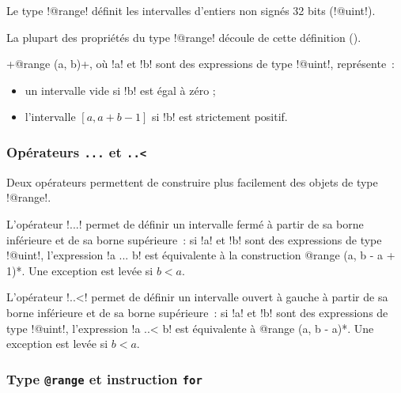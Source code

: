




Le type \ggsq!@range! définit les intervalles d'entiers non signés 32 bits (\ggsq!@uint!).


La plupart des propriétés du type \ggsq!@range! découle de cette définition ().

\ggsq+@range (a, b)+, où \ggsq!a! et \ggsq!b! sont des expressions de type \ggsq!@uint!, représente~:
\begin{itemize}
  \item un intervalle vide si \ggsq!b! est égal à zéro ;
  \item l'intervalle $[a, a+b-1]$ si \ggsq!b! est strictement positif.
\end{itemize}



\subsubsection{Opérateurs \texttt{.{}.{}.} et \texttt{.{}.{}<}}

Deux opérateurs permettent de construire plus facilement des objets de type \ggsq!@range!.

L'opérateur \ggsq!...! permet de définir un intervalle fermé à partir de sa borne inférieure et de sa borne supérieure~: si \ggsq!a! et \ggsq!b! sont des expressions de type \ggsq!@uint!, l'expression \ggsq!a ... b! est équivalente à la construction \ggsq*@range (a, b - a + 1)*. Une exception est levée si $b < a$.

L'opérateur \ggsq!..<! permet de définir un intervalle ouvert à gauche à partir de sa borne inférieure et de sa borne supérieure~: si \ggsq!a! et \ggsq!b! sont des expressions de type \ggsq!@uint!, l'expression \ggsq!a ..< b! est équivalente à \ggsq*@range (a, b - a)*. Une exception est levée si $b < a$.

\subsubsection{Type \texttt{@range} et instruction \texttt{for}}

